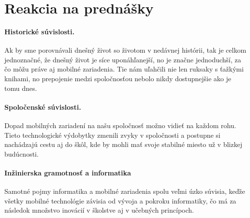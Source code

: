 \documentclass[10pt,oneside,slovak,a4paper]{article}
\begin{document}
\section{Reakcia na prednášky} \label{reakcie}

\paragraph{Historické súvislosti.}
Ak by sme porovnávali dnešný život so životom v nedávnej histórii, tak je celkom jednoznačné, že dnešný život je síce uponáhľanejší, no je značne jednoduchší, za čo môžu práve aj mobilné zariadenia. Tie nám uľahčili nie len ruksaky s ťažkými knihami, no prepojenie medzi spoločnosťou nebolo nikdy dostupnejšie ako je tomu dnes.

\paragraph{Spoločenské súvislosti.} 
Dopad mobilných zariadení na našu spoločnosť možno vidieť na každom rohu. Tieto technologické výdobytky zmenili zvyky v spoločnosti a postupne si nachádzajú cestu aj do škôl, kde by mohli mať svoje stabilné miesto už v blizkej budúcnosti.

\paragraph{Inžinierska gramotnosť a informatika}
Samotné pojmy informatika a mobilné zariadenia spolu veľmi úzko súvisia, keďže všetky mobilné technológie závisia od vývoja a pokroku informatiky, čo má za následok množstvo inovácií v školstve aj v učebných princípoch.






\end{document}

